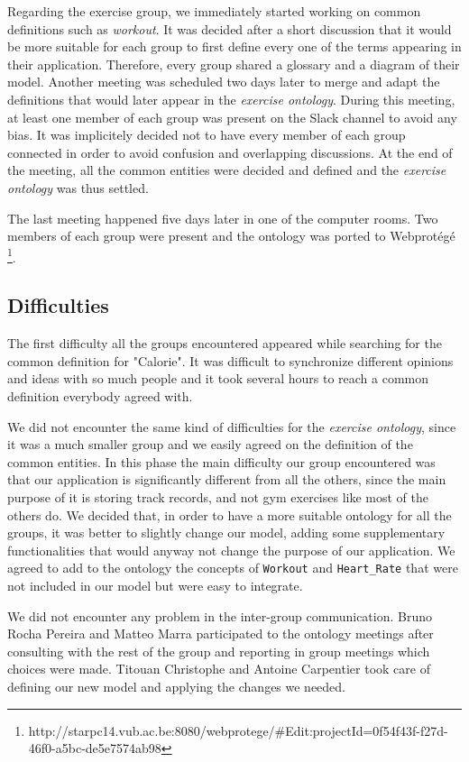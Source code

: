 \documentclass[a4paper]{article}
\begin{document}
Regarding the exercise group, we immediately started working on common definitions such as \textit{workout}. It was decided after a short discussion that it would be more suitable for each group to first define every one of the terms appearing in their application.  Therefore, every group shared a glossary and a diagram of their model. Another meeting was scheduled two days later to merge and adapt the definitions that would later appear in the \textit{exercise ontology}. During this meeting, at least one member of each group was present on the Slack channel to avoid any bias. It was implicitely decided not to have every member of each group connected in order to avoid confusion and overlapping discussions. At the end of the meeting, all the common entities were decided and defined and the \textit{exercise ontology} was thus settled.

The last meeting happened five days later in one of the computer rooms. Two members of each group were present and the ontology was ported to Webprotégé \footnote{http://starpc14.vub.ac.be:8080/webprotege/\#Edit:projectId=0f54f43f-f27d-46f0-a5bc-de5e7574ab98}. 

\subsection{Difficulties}
The first difficulty all the groups encountered appeared while searching for the common definition for "Calorie". It was difficult to synchronize different opinions and ideas with so much people and it took several hours to reach a common definition everybody agreed with.

We did not encounter the same kind of difficulties for the \textit{exercise ontology}, since it was a much smaller group and we easily agreed on the definition of the common entities.
In this phase the main difficulty our group encountered was that our application is significantly different from all the others, since the main purpose of it is storing track records, and not gym exercises like most of the others do.
We decided that, in order to have a more suitable ontology for all the groups, it was better to slightly change our model, adding some supplementary functionalities that would anyway not change the purpose of our application. 
We agreed to add to the ontology the concepts of \texttt{Workout} and \texttt{Heart\_Rate} that were not included in our model but were easy to integrate. 

We did not encounter any problem in the inter-group communication. 
Bruno Rocha Pereira and Matteo Marra participated to the ontology meetings after consulting with the rest of the group and reporting in group meetings which choices were made. 
Titouan Christophe and Antoine Carpentier took care of defining our new model and applying the changes we needed. 
\end{document}
